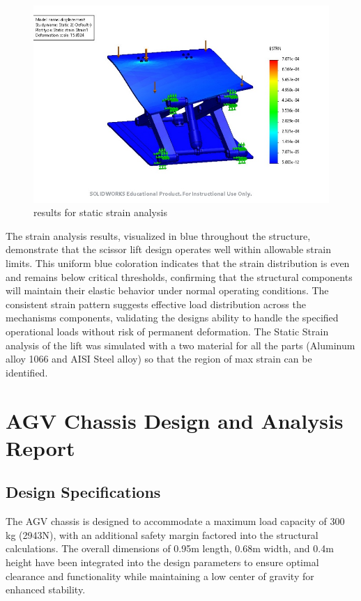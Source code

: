 \documentclass[../../main]{subfiles}
\begin{document}
\begin{figure}[h!]
  \centering
  \includegraphics[width=\textwidth]{img/image107.jpg}
  \caption{results for static strain analysis}
  \end{figure}
  

The strain analysis results, visualized in blue throughout the
structure, demonstrate that the scissor lift design operates well within
allowable strain limits. This uniform blue coloration indicates that the
strain distribution is even and remains below critical thresholds,
confirming that the structural components will maintain their elastic
behavior under normal operating conditions. The consistent strain
pattern suggests effective load distribution across the
mechanism\textquotesingle s components, validating the
design\textquotesingle s ability to handle the specified operational
loads without risk of permanent deformation. The Static Strain analysis
of the lift was simulated with a two material for all the parts
(Aluminum alloy 1066 and AISI Steel alloy) so that the region of max
strain can be identified.

\newpage
\section{AGV Chassis Design and Analysis
Report}\label{agv-chassis-design-and-analysis-report}

\subsection{Design Specifications}\label{design-specifications}

The AGV chassis is designed to accommodate a maximum load capacity of
300 kg (2943N), with an additional safety margin factored into the
structural calculations. The overall dimensions of 0.95m length, 0.68m
width, and 0.4m height have been integrated into the design parameters
to ensure optimal clearance and functionality while maintaining a low
center of gravity for enhanced stability.
\end{document}
